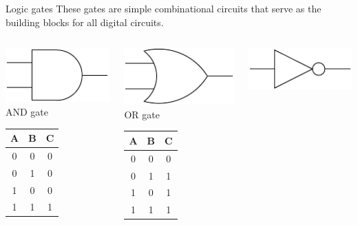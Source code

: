 \begin{frame}{Logic gates}
  These gates are simple combinational circuits that serve as the building blocks for all digital circuits.
  \begin{columns}
    \begin{column}{3cm}
      \begin{center}
        \includegraphics{../Introduction/ANDGate}
        \\AND gate
        \begin{tabular}{cc|c}
          \textbf{A} & \textbf{B} & \textbf{C} \\
          \hline
          0 & 0 & 0 \\
          0 & 1 & 0 \\
          1 & 0 & 0 \\
          1 & 1 & 1 \\
        \end{tabular}
      \end{center}
    \end{column}
    \begin{column}{3cm}
      \begin{center}
        \includegraphics{../Introduction/ORGate}
        \\OR gate
        \begin{tabular}{cc|c}
          \textbf{A} & \textbf{B} & \textbf{C} \\
          \hline
          0 & 0 & 0 \\
          0 & 1 & 1 \\
          1 & 0 & 1 \\
          1 & 1 & 1 \\
        \end{tabular}
      \end{center}
    \end{column}
    \begin{column}{3cm}
      \begin{center}
        \includegraphics{../Introduction/NOTGate}

\end{center}
\end{column}
\end{columns}
\end{frame}
